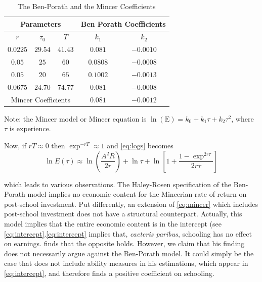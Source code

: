 \begin{center}
\begin{table}[H]
\begin{threeparttable}
\fontsize{9}{12pt}\selectfont
\caption{The Ben-Porath and the Mincer Coefficients} \label{table:bpmincer}
\centering
\begin{tabular}{ccc|cc}
\multicolumn{3}{c|}{Parameters} & \multicolumn{2}{c}{Ben Porath
Coefficients} \\ \hline\hline $r$ & $\tau _{0}$ & $T$ & $k_{1}$ &
$k_{2}$ \\ \hline $0.0225$ & $29.54$ & $41.43$ & $0.081$ & $-0.0010$
\\ \hline $0.05$ & $25$ & $60$ & $0.0808$ & $-0.0008$ \\ \hline
$0.05$ & $20$ & $65$ & $0.1002$ & $-0.0013$ \\ \hline $0.0675$ &
$24.70$ & $74.77$ & $0.081$ & $-0.0008$ \\ \hline\hline
\multicolumn{3}{c}{Mincer Coefficients} & $0.081$ & $-0.0012$ \\
\hline
\end{tabular}
\begin{tablenotes}
\small
\item Note: the Mincer model or Mincer equation is $\ln ( \text{E} ) =k_{0}+k_{1}\tau +k_{2}\tau^{2}$, where $\tau$ is experience.  
\end{tablenotes}
\end{threeparttable}
\end{table}
\end{center}

Now, if $rT \approx 0$ then $\exp^{-rT} \approx 1$ and \eqref{eq:logs} becomes 
\begin{equation}
\ln E(\tau) \approx \ln \left( \frac{A^2 R}{2r} \right) + \ln \tau + \ln \left[ 1 + \frac{1 - \exp^{2r \tau}}{2 r \tau} \right] \label{eq:intercept}
\end{equation}

\noindent which leads to various observations. The Haley-Rosen specification of the Ben-Porath model implies no economic content for the Mincerian rate of return on post-school investment. Put differently, an extension of \eqref{eq:mincer} which includes post-school investment does not have a structural counterpart. Actually, this model implies that the entire economic content is in the intercept (see \eqref{eq:intercept}.\eqref{eq:intercept} implies that, \textit{caeteris paribus}, schooling has no effect on earnings. \citet{mincer1974schooling} finds that the opposite holds. However, we claim that his finding does not necessarily argue against the Ben-Porath model. It could simply be the case that \citet{mincer1974schooling} does not include ability measures in his estimations, which appear in \eqref{eq:intercept}, and therefore finds a positive coefficient on schooling. 
 
